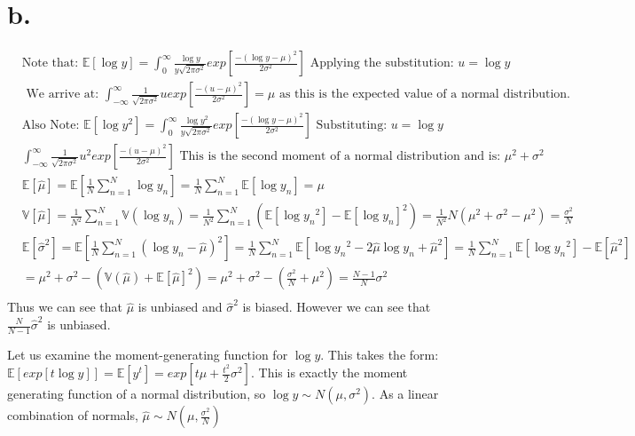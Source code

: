 \documentclass{paper}
\begin{document}
\section*{b.}
\begin{equation*}
\begin{alignedat}{2}
&\text{Note that: }\mathbb{E}[ \log{y} ] = \int_0^\infty \frac{ \log{y} }{ y \sqrt{ 2 \pi \sigma^2 }} exp[ \frac{ - ( \log{y} - \mu )^2 }{ 2 \sigma^2 } ] \text{ Applying the substitution: }u = \log{y} \\
&\text{ We arrive at: } \int_{-\infty}^\infty \frac{ 1}{ \sqrt{ 2 \pi \sigma^2 } } u exp[ \frac{ - ( u - \mu )^2 }{ 2 \sigma^2 } ] = \mu \text{ as this is the expected value of a normal distribution.}\\
&\text{Also Note: }\mathbb{E}[ \log{y}^2 ] = \int_0^\infty \frac{ \log{y}^2 }{ y \sqrt{ 2 \pi \sigma^2 }} exp[ \frac{ - ( \log{y} - \mu )^2 }{ 2 \sigma^2 } ]\text{ Substituting: }u = \log{y}\\
&\int_{-\infty}^\infty \frac{ 1}{ \sqrt{ 2 \pi \sigma^2 } } u^2 exp[ \frac{ - ( u - \mu )^2 }{ 2 \sigma^2 } ]\text{ This is the second moment of a normal distribution and is: }\mu^2 + \sigma^2\\
&\mathbb{E}[\hat{\mu}] = \mathbb{E}[ \frac{1}{N} \sum_{n=1}^N \log{ y_n } ] = \frac{1}{N} \sum_{n=1}^N \mathbb{E}[\log{ y_n }] = \mu\\
&\mathbb{V}[\hat{\mu}] = \frac{1}{N^2} \sum_{n=1}^N \mathbb{V}(\log{ y_n }) =\frac{1}{N^2} \sum_{n=1}^N (\mathbb{E}[\log{y_n}^2] - \mathbb{E}[\log{y_n}]^2) = \frac{ 1}{N^2} N( \mu^2 + \sigma^2 - \mu^2 ) = \frac{ \sigma^2}{N}\\
&\mathbb{E}[\hat{\sigma}^2] = \mathbb{E}[ \frac{1}{N} \sum_{n=1}^N ( \log{ y_n } - \hat{ \mu } )^2 ] = \frac{1}{N} \sum_{n=1}^N \mathbb{E}[ \log{ y_n }^2 - 2 \hat{ \mu } \log{y_n} + \hat{ \mu }^2 ] = \frac{1}{N} \sum_{n=1}^N \mathbb{E}[ \log{ y_n }^2]  - \mathbb{E}[\hat{ \mu }^2 ]\\
&= \mu^2 + \sigma^2 - ( \mathbb{V}(\hat{\mu}) + \mathbb{E}[\hat{\mu}]^2 ) = \mu^2 + \sigma^2 - ( \frac{ \sigma^2}{N} + \mu^2 ) = \frac{N-1}{N} \sigma^2\\
\end{alignedat}
\end{equation*}
Thus we can see that $\hat{\mu}$ is unbiased and $\hat{\sigma}^2$ is biased. However we can see that $\frac{N}{N-1} \hat{ \sigma }^2$ is unbiased.



Let us examine the moment-generating function for $\log{y}$. This takes the form: $\mathbb{E}[ exp[ t \log{y} ] ] =  \mathbb{E}[ y^t ] = exp[ t \mu + \frac{t^2}{2} \sigma^2 ]$. This is exactly the moment generating function of a normal distribution, so $\log{y} \sim N( \mu, \sigma^2 )$. As a linear combination of normals, $\hat{ \mu } \sim N( \mu, \frac{ \sigma^2}{N} )$ 
\end{document}
